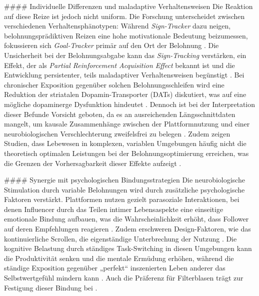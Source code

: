 \documentclass[11pt,a4paper]{article}
\begin{document}
\#\#\#\# Individuelle Differenzen und maladaptive Verhaltensweisen Die Reaktion auf diese Reize ist jedoch nicht uniform. Die Forschung unterscheidet zwischen verschiedenen Verhaltensphänotypen: Während \textit{Sign-Tracker} dazu neigen, belohnungsprädiktiven Reizen eine hohe motivationale Bedeutung beizumessen, fokussieren sich \textit{Goal-Tracker} primär auf den Ort der Belohnung \autocite{europepmc_42137086}. Die Unsicherheit bei der Belohnungsabgabe kann das \textit{Sign-Tracking} verstärken, ein Effekt, der als \textit{Partial Reinforcement Acquisition Effect} bekannt ist und die Entwicklung persistenter, teils maladaptiver Verhaltensweisen begünstigt \autocite{europepmc_42137086}. Bei chronischer Exposition gegenüber solchen Belohnungsschleifen wird eine Reduktion der striatalen Dopamin-Transporter (DATs) diskutiert, was auf eine mögliche dopaminerge Dysfunktion hindeutet \autocite{crossref_10_51473_rcmos_v1i2_2025_1736}. Dennoch ist bei der Interpretation dieser Befunde Vorsicht geboten, da es an ausreichenden Längsschnittdaten mangelt, um kausale Zusammenhänge zwischen der Plattformnutzung und einer neurobiologischen Verschlechterung zweifelsfrei zu belegen \autocite{crossref_10_51473_rcmos_v1i2_2025_1736}. Zudem zeigen Studien, dass Lebewesen in komplexen, variablen Umgebungen häufig nicht die theoretisch optimalen Leistungen bei der Belohnungsoptimierung erreichen, was die Grenzen der Vorhersagbarkeit dieser Effekte aufzeigt \autocite{crossref_10_3758_bf03209807}.

\#\#\#\# Synergie mit psychologischen Bindungsstrategien Die neurobiologische Stimulation durch variable Belohnungen wird durch zusätzliche psychologische Faktoren verstärkt. Plattformen nutzen gezielt parasoziale Interaktionen, bei denen Influencer durch das Teilen intimer Lebensaspekte eine einseitige emotionale Bindung aufbauen, was die Wahrscheinlichkeit erhöht, dass Follower auf deren Empfehlungen reagieren \autocite{grey_grey_5d5c282590c448fc8776b04f78a08de5}. Zudem erschweren Design-Faktoren, wie das kontinuierliche Scrollen, die eigenständige Unterbrechung der Nutzung \autocite{grey_grey_3467cac0f11d4b1e86319128da218a3e}. Die kognitive Belastung durch ständiges Task-Switching in diesen Umgebungen kann die Produktivität senken und die mentale Ermüdung erhöhen, während die ständige Exposition gegenüber „perfekt“ inszenierten Leben anderer das Selbstwertgefühl mindern kann \autocite{grey_grey_d4bc9c0d0e8441ba90398520e73af07d,grey_grey_3467cac0f11d4b1e86319128da218a3e,grey_grey_f99abd6bfbd04efc8def60bb6988ce35}. Auch die Präferenz für Filterblasen trägt zur Festigung dieser Bindung bei \autocite{grey_grey_bbc8a51d8734471c850e8c2939fe8d32}.
\end{document}
